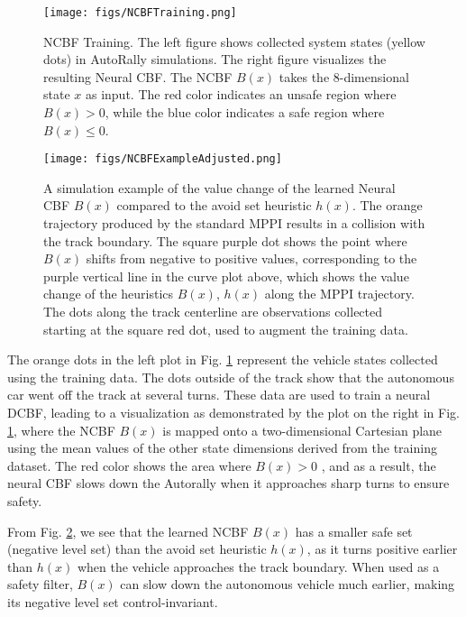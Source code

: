 \begin{figure}[!h]
    \centering
    \centerline{\texttt{[image: figs/NCBFTraining.png]}}
    \caption{NCBF Training. The left figure shows  collected system states (yellow dots) in AutoRally simulations. The right figure visualizes the resulting Neural CBF. The NCBF $B(x)$ takes the 8-dimensional state $x$ as input. 
    The red color indicates an unsafe region where $B(x) > 0$, while the blue color indicates a safe region where $B(x) \leq 0$.}
    \label{fig:NCBFTraining}
\end{figure}

\begin{figure}[!h]
    \centering
    \centerline{\texttt{[image: figs/NCBFExampleAdjusted.png]}}
    \caption{A simulation example of the value change of the learned Neural CBF $B(x)$ compared to the avoid set heuristic $h(x)$. The orange trajectory produced by the standard MPPI results in a collision with the track boundary. The square purple dot shows the point where $B(x)$ shifts from negative to positive values, corresponding to the purple vertical line in the curve plot above, which shows the value change of the heuristics $B(x)$, $h(x)$ along the MPPI trajectory. The dots along the track centerline are observations collected starting at the square red dot, used to augment the training data.}
    \label{fig:NCBFexample}
\end{figure}
 The orange dots in the left plot in Fig. \ref{fig:NCBFTraining} represent the vehicle states collected using the training data. The dots outside of the track show that the autonomous car went off the track at several turns. These data are used to train a neural DCBF, leading to a visualization as demonstrated by the plot on the right in Fig. \ref{fig:NCBFTraining}, where the NCBF $B(x)$ is mapped onto a two-dimensional Cartesian plane using the mean values of the other state dimensions derived from the training dataset. The red color shows the area where $B(x) > 0$ , and as a result, the neural CBF slows down the Autorally when it approaches sharp turns to ensure safety.

From Fig. \ref{fig:NCBFexample}, we see that the learned NCBF $B(x)$ has a smaller safe set (negative level set) than the avoid set heuristic $h(x)$, as it turns positive earlier than $h(x)$ when the vehicle approaches the track boundary. When used as a safety filter, $B(x)$ can slow down the autonomous vehicle much earlier, making its negative level set control-invariant. 